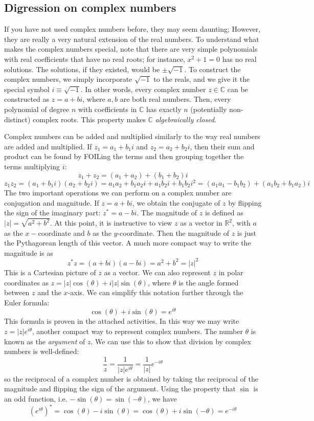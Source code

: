 \documentclass{article}
\begin{document}
\subsection{Digression on complex numbers}
If you have not used complex numbers before, they may seem daunting; However, they are really a very natural extension of the real numbers. To understand what makes the complex numbers special, note that there are very simple polynomials with real coefficients that have no real roots; for instance, $x^2+1 = 0$ has no real solutions. The solutions, if they existed, would be $\pm \sqrt{-1}$. To construct the complex numbers, we simply incorporate $\sqrt{-1}$ to the reals, and we give it the special symbol $i \equiv \sqrt{-1}$. In other words, every complex number $z \in \mathbb C$ can be constructed as $z = a + bi$, where $a,b$ are both real numbers. Then, every polynomial of degree $n$ with coefficients in $\mathbb C$ has exactly $n$ (potentially non-distinct) complex roots. This property makes $\mathbb C$ \textit{algebraically closed}. 
\par Complex numbers can be added and multiplied similarly to the way real numbers are added and multiplied. If $z_1 = a_1 + b_1i$ and $z_2 = a_2 + b_2i$, then their sum and product can be found by FOILing the terms and then grouping together the terms multiplying $i$:
$$
z_1 + z_2 = (a_1 + a_2) + (b_1 + b_2)i 
$$
$$
z_1z_2 = (a_1 + b_1i)(a_2 + b_2i) = a_1a_2 + b_1a_2i+a_1b_2i + b_1b_2i^2 = (a_1a_1-b_1b_2) + (a_1b_2 + b_1a_2)i
$$
The two important operations we can perform on a complex number are conjugation and magnitude. If $z = a+bi$, we obtain the conjugate of $z$ by flipping the sign of the imaginary part: $z^\ast = a - bi$. The magnitude of $z$ is defined as $\vert z \vert = \sqrt{a^2 + b^2}$. At this point, it is instructive to view $z$ as a vector in $\mathbb R^2$, with $a$ as the $x-$coordinate and $b$ as the $y$-coordinate. Then the magnitude of $z$ is just the Pythagorean length of this vector. A much more compact way to write the magnitude is as
$$
z^\ast z = (a+bi)(a-bi) = a^2 + b^2 = |z|^2
$$
This is a Cartesian picture of $z$ as a vector. We can also represent $z$ in polar coordinates as $z = \vert z \vert\cos(\theta) + i\vert z \vert\sin(\theta)$, where $\theta$ is the angle formed between $z$ and the $x$-axis. We can simplify this notation further through the Euler formula:
$$
\cos(\theta) + i \sin(\theta) = e^{i\theta}
$$
This formula is proven in the attached activities. In this way we may write $z = |z|e^{i\theta}$, another compact way to represent complex numbers. The number $\theta$ is known as the \textit{argument} of $z$. We can use this to show that division by complex numbers is well-defined:
$$
\frac{1}{z} = \frac{1}{|z|e^{i\theta}} = \frac{1}{|z|}e^{-i\theta}
$$
so the reciprocal of a complex number is obtained by taking the reciprocal of the magnitude and flipping the sign of the argument. Using the property that $\sin$ is an odd function, i.e. $-\sin(\theta) = \sin(-\theta)$, we have
$$
(e^{i\theta})^\ast = \cos(\theta) - i\sin(\theta) = \cos(\theta) + i \sin(-\theta) = e^{-i\theta}
$$
\end{document}
